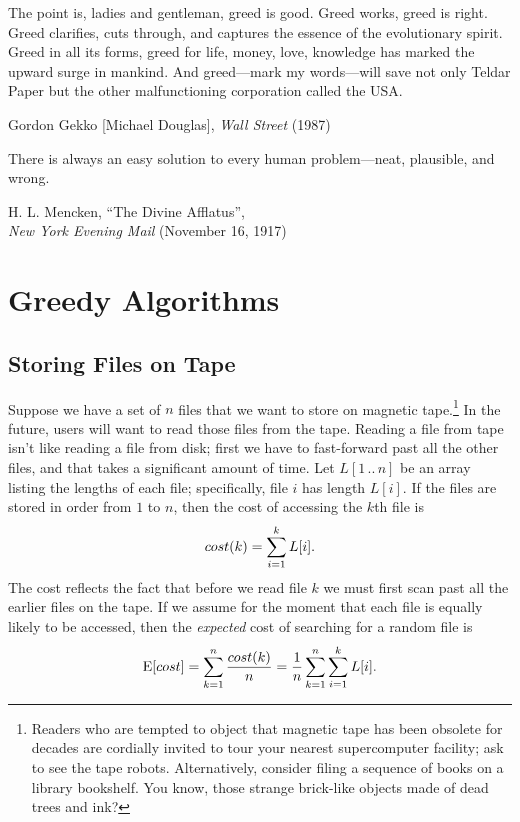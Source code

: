 \epigraph{The point is, ladies and gentleman, greed is good. Greed works, greed is right. Greed clarifies, cuts through, and captures the essence of the evolutionary spirit. Greed in all its forms, greed for life, money, love, knowledge has marked the upward surge in mankind. And greed---mark my words---will save not only Teldar Paper but the other malfunctioning corporation called the USA.}{Gordon Gekko [Michael Douglas], \textit{Wall Street} (1987)}

\epigraph{There is always an easy solution to every human problem---neat, plausible, and wrong.}{H. L. Mencken, “The Divine Afflatus”,\\\textit{New York Evening Mail} (November 16, 1917)}

\chapter{Greedy Algorithms}
\label{ch:4}

\section{Storing Files on Tape}
\label{sec:4.1}

Suppose we have a set of $n$ files that we want to store on magnetic tape.\footnote{Readers who are tempted to object that magnetic tape has been obsolete for decades are cordially invited to tour your nearest supercomputer facility; ask to see the tape robots. Alternatively, consider filing a sequence of books on a library bookshelf. You know, those strange brick-like objects made of dead trees and ink?}
In the future, users will want to read those files from the tape.
Reading a file from tape isn’t like reading a file from disk; first we have to fast-forward past all the other files, and that takes a significant amount of time.
Let $L[1\,..\,n]$ be an array listing the lengths of each file; specifically, file $i$ has length $L[i]$.
If the files are stored in order from $1$ to $n$, then the cost of accessing the $k$th file is
\[
cost(k) = \sum_{i=1}^{k} L[i].
\]
The cost reflects the fact that before we read file $k$ we must first scan past all the earlier files on the tape.
If we assume for the moment that each file is equally likely to be accessed, then the \textit{expected} cost of searching for a random file is
\[
\mathrm{E}[cost] = \sum_{k=1}^{n} \frac{cost(k)}{n} = \frac{1}{n} \sum_{k=1}^{n} \sum_{i=1}^{k} L[i].
\]

